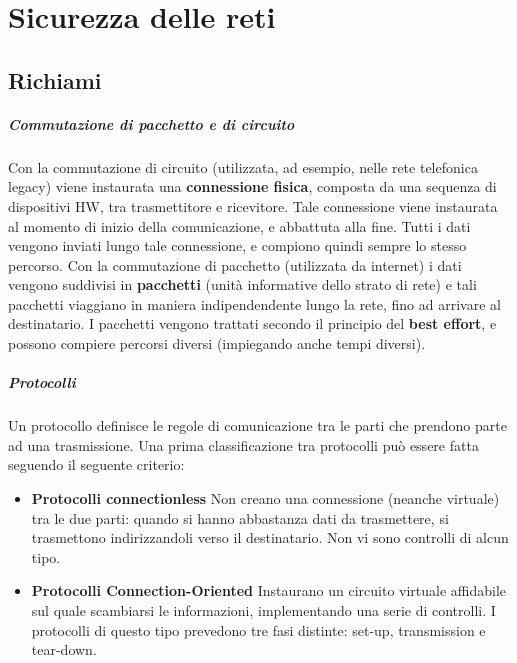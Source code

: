 \chapter{Sicurezza delle reti}
\section{Richiami}
\paragraph{Commutazione di pacchetto e di circuito}
Con la commutazione di circuito (utilizzata, ad esempio, nelle rete telefonica legacy) viene instaurata una \textbf{connessione fisica}, composta da una sequenza di dispositivi HW, tra trasmettitore e ricevitore. Tale connessione viene instaurata al momento di inizio della comunicazione, e abbattuta alla fine. Tutti i dati vengono inviati lungo tale connessione, e compiono quindi sempre lo stesso percorso.
\newline \newline
Con la commutazione di pacchetto (utilizzata da internet) i dati vengono suddivisi in \textbf{pacchetti} (unità informative dello strato di rete) e tali pacchetti viaggiano in maniera indipendendente lungo la rete, fino ad arrivare al destinatario. I pacchetti vengono trattati secondo il principio del \textbf{best effort}, e possono compiere percorsi diversi (impiegando anche tempi diversi).
\paragraph{Protocolli}
Un protocollo definisce le regole di comunicazione tra le parti che prendono parte ad una trasmissione. Una prima classificazione tra protocolli può essere fatta seguendo il seguente criterio:
\begin{itemize}
\item \textbf{Protocolli connectionless} Non creano una connessione (neanche virtuale) tra le due parti: quando si hanno abbastanza dati da trasmettere, si trasmettono indirizzandoli verso il destinatario. Non vi sono controlli di alcun tipo.
\item \textbf{Protocolli Connection-Oriented} Instaurano un circuito virtuale affidabile sul quale scambiarsi le informazioni, implementando una serie di controlli. I protocolli di questo tipo prevedono  tre fasi distinte: set-up, transmission e tear-down.
\end{itemize}

